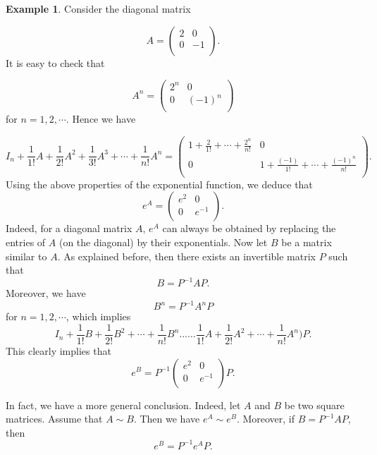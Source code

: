 \documentclass[11pt]{article}
\theoremstyle{definition}
\newtheorem{exmp}[thm]{Example}
\theoremstyle{plain}
\begin{document}
\begin{exmp}
Consider the diagonal matrix

\[
A = \left(\begin{array}{cc} 2&0\\ 0&-1\\ \end{array}\right).
\]
It is easy to check that

\[
A^n = \left(\begin{array}{cc} 2^n&0\\ 0&(-1)^n\\ \end{array}\right)
\]
for $n=1,2,\cdots$. Hence we have

\[
I_n + \frac{1}{1!}A+ \frac{1}{2!}A^2+ \frac{1}{3!}A^3+\cdots+ \frac{1}{n!}A^n=
\left(\begin{array}{cc}
1 + \frac{2}{1!}+ \cdots+\frac{2^n}{n!} & 0\\
0& 1+\frac{(-1)}{1!}+\cdots+ \frac{(-1)^n}{n!}\\
\end{array}\right).
\]
Using the above properties of the exponential function, we deduce that
\[
e^A = \left(\begin{array}{cc} e^2&0\\ 0&e^{-1}\\ \end{array}\right).
\]
Indeed, for a diagonal matrix $A$, $e^A$ can always be obtained by replacing the entries of $A$ (on the diagonal) by their exponentials. Now let $B$ be a matrix similar to $A$. As explained before, then there exists an invertible matrix $P$ such that
\[
B = P^{-1}AP.
\]
Moreover, we have
\[
B^n = P^{-1}A^nP
\]
for $n=1,2,\cdots$, which implies
\[
I_n + \frac{1}{1!}B+ \frac{1}{2!}B^2+\cdots+ \frac{1}{n!}B^n ... ... \frac{1}{1!}A+ \frac{1}{2!}A^2+\cdots+ \frac{1}{n!}A^n\Bigg)P.
\]
This clearly implies that
\[
e^B = P^{-1}\left(\begin{array}{cc} e^2&0\\ 0&e^{-1}\\ \end{array}\right)P.
\]
\end{exmp}
In fact, we have a more general conclusion. Indeed, let $A$ and $B$ be two square matrices. Assume that $A \sim B$. Then we have $e^A \sim e^B$. Moreover, if $B = P^{-1}AP$, then
\[
e^B = P^{-1}e^AP.
\]
\end{document}
